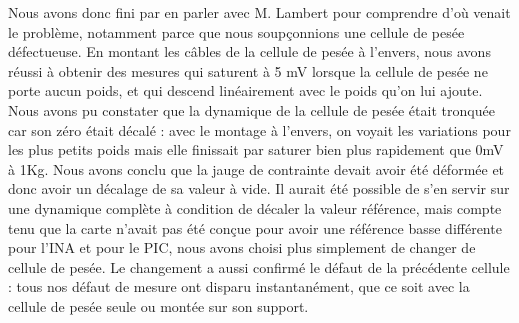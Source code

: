 \documentclass[a4paper,11pt,titlepage]{article}
\begin{document}
Nous avons donc fini par en parler avec M. Lambert pour comprendre d'où venait le problème, notamment parce que nous soupçonnions une cellule de pesée défectueuse.
En montant les câbles de la cellule de pesée à l'envers, nous avons réussi à obtenir des mesures qui saturent à 5 mV lorsque la cellule de pesée ne porte aucun poids, et qui descend linéairement avec le poids qu'on lui ajoute. Nous avons pu constater que la dynamique de la cellule de pesée était tronquée car son zéro était décalé : avec le montage à l'envers, on voyait les variations pour les plus petits poids mais elle finissait par saturer bien plus rapidement que 0mV à 1Kg. Nous avons conclu que la jauge de contrainte devait avoir été déformée et donc avoir un décalage de sa valeur à vide. Il aurait été possible de s'en servir sur une dynamique complète à condition de décaler la valeur référence, mais compte tenu que la carte n'avait pas été conçue pour avoir une référence basse différente pour l'INA et pour le PIC, nous avons choisi plus simplement de changer de cellule de pesée.
Le changement a aussi confirmé le défaut de la précédente cellule : tous nos défaut de mesure ont disparu instantanément, que ce soit avec la cellule de pesée seule ou montée sur son support.
\end{document}
